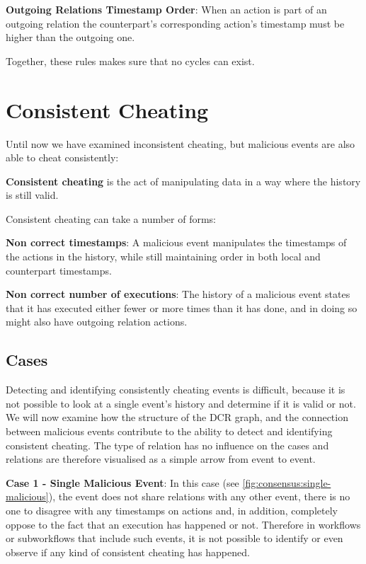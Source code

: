 	\newpar \textbf{Outgoing Relations Timestamp Order}: When an action is part of an outgoing relation the counterpart's corresponding action's timestamp must be higher than the outgoing one.
	
	\newpar Together, these rules makes sure that no cycles can exist. 
	
	\section{Consistent Cheating}
	Until now we have examined inconsistent cheating, but malicious events are also able to cheat consistently:
	\begin{definition}
		\textbf{Consistent cheating} is the act of manipulating data in a way where the history is still valid.
	\end{definition}
	
	\newpar Consistent cheating can take a number of forms:

	\newpar \textbf{Non correct timestamps}: A malicious event manipulates the timestamps of the actions in the history, while still maintaining order in both local and counterpart timestamps.
	
	\newpar \textbf{Non correct number of executions}: The history of a malicious event states that it has executed either fewer or more times than it has done, and in doing so might also have outgoing relation actions.
	
	\subsection{Cases}
	Detecting and identifying consistently cheating events is difficult, because it is not possible to look at a single event's history and determine if it is valid or not. We will now examine how the structure of the DCR graph, and the connection between malicious events contribute to the ability to detect and identifying consistent cheating. The type of relation has no influence on the cases and relations are therefore visualised as a simple arrow from event to event.
	
	\newpar \textbf{Case 1 - Single Malicious Event}: In this case (see \ref{fig:consensus:single-malicious}), the event does not share relations with any other event, there is no one to disagree with any timestamps on actions and, in addition, completely oppose to the fact that an execution has happened or not. Therefore in workflows or subworkflows that include such events, it is not possible to identify or even observe if any kind of consistent cheating has happened.
	
